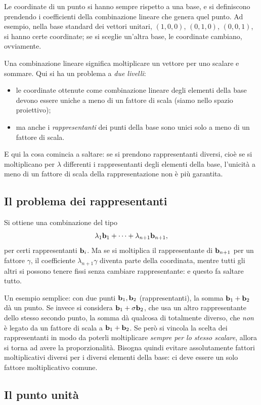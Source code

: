 Le coordinate di un punto si hanno sempre rispetto a una base, e si definiscono prendendo i coefficienti della combinazione lineare che genera quel punto. Ad esempio, nella base standard dei vettori unitari, $(1,0,0)$, $(0,1,0)$, $(0,0,1)$, si hanno certe coordinate; se si sceglie un'altra base, le coordinate cambiano, ovviamente.

Una combinazione lineare significa moltiplicare un vettore per uno scalare e sommare. Qui si ha un problema a \emph{due livelli}:
\begin{itemize}
  \item le coordinate ottenute come combinazione lineare degli elementi della base devono essere uniche a meno di un fattore di scala (siamo nello spazio proiettivo);
  \item ma anche i \emph{rappresentanti} dei punti della base sono unici solo a meno di un fattore di scala.
\end{itemize}
E qui la cosa comincia a saltare: se si prendono rappresentanti diversi, cioè se si moltiplicano per $\lambda$ differenti i rappresentanti degli elementi della base, l'unicità a meno di un fattore di scala della rappresentazione non è più garantita.

\subsection{Il problema dei rappresentanti}

Si ottiene una combinazione del tipo
\[
  \lambda_1\mathbf{b}_1+\dots+\lambda_{n+1}\mathbf{b}_{n+1},
\]
per certi rappresentanti $\mathbf{b}_i$. Ma se si moltiplica il rappresentante di $\mathbf{b}_{n+1}$ per un fattore $\gamma$, il coefficiente $\lambda_{n+1}\gamma$ diventa parte della coordinata, mentre tutti gli altri si possono tenere fissi senza cambiare rappresentante: e questo fa saltare tutto.

Un esempio semplice: con due punti $\mathbf{b}_1,\mathbf{b}_2$ (rappresentanti), la somma $\mathbf{b}_1+\mathbf{b}_2$ dà un punto. Se invece si considera $\mathbf{b}_1+\sigma\mathbf{b}_2$, che usa un altro rappresentante dello stesso secondo punto, la somma dà qualcosa di totalmente diverso, che \emph{non} è legato da un fattore di scala a $\mathbf{b}_1+\mathbf{b}_2$. Se però si vincola la scelta dei rappresentanti in modo da poterli moltiplicare \emph{sempre per lo stesso scalare}, allora si torna ad avere la proporzionalità. Bisogna quindi evitare assolutamente fattori moltiplicativi diversi per i diversi elementi della base: ci deve essere un solo fattore moltiplicativo comune.

\subsection{Il punto unità}

